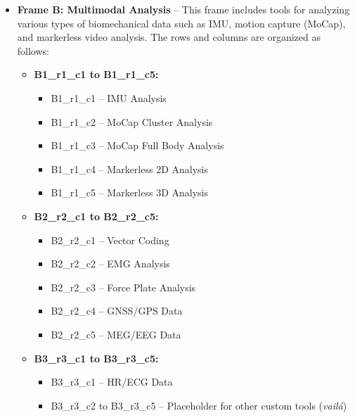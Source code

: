 \documentclass{article}
\begin{document}
\begin{itemize}
    \item \textbf{Frame B: Multimodal Analysis} – This frame includes tools for analyzing various types of biomechanical data such as IMU, motion capture (MoCap), and markerless video analysis. The rows and columns are organized as follows:
    \begin{itemize}
        \item \textbf{B1\_r1\_c1 to B1\_r1\_c5:} 
        \begin{itemize}
            \item B1\_r1\_c1 – IMU Analysis
            \item B1\_r1\_c2 – MoCap Cluster Analysis
            \item B1\_r1\_c3 – MoCap Full Body Analysis
            \item B1\_r1\_c4 – Markerless 2D Analysis
            \item B1\_r1\_c5 – Markerless 3D Analysis
        \end{itemize}
        \item \textbf{B2\_r2\_c1 to B2\_r2\_c5:}
        \begin{itemize}
            \item B2\_r2\_c1 – Vector Coding
            \item B2\_r2\_c2 – EMG Analysis
            \item B2\_r2\_c3 – Force Plate Analysis
            \item B2\_r2\_c4 – GNSS/GPS Data
            \item B2\_r2\_c5 – MEG/EEG Data
        \end{itemize}
        \item \textbf{B3\_r3\_c1 to B3\_r3\_c5:}
        \begin{itemize}
            \item B3\_r3\_c1 – HR/ECG Data
            \item B3\_r3\_c2 to B3\_r3\_c5 – Placeholder for other custom tools (\textit{vailá})
        \end{itemize}
    \end{itemize}


\end{itemize}
\end{document}
